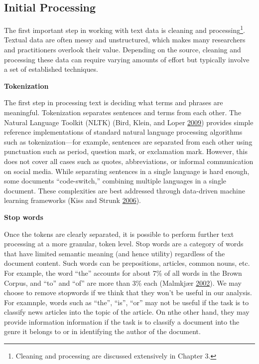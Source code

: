 \documentclass[]{krantz}
\begin{document}
\subsection{Initial Processing}\label{initial-processing}

The first important step in working with text data is cleaning and
processing\footnote{Cleaning and processing are discussed extensively in
  Chapter 3.}. Textual data are often messy and unstructured, which
makes many researchers and practitioners overlook their value. Depending
on the source, cleaning and processing these data can require varying
amounts of effort but typically involve a set of established techniques.

\textbf{Tokenization}

The first step in processing text is deciding what terms and phrases are
meaningful. Tokenization separates sentences and terms from each other.
The Natural Language Toolkit (NLTK) (Bird, Klein, and Loper
\protect\hyperlink{ref-bird-09}{2009}) provides simple reference
implementations of standard natural language processing algorithms such
as tokenization---for example, sentences are separated from each other
using punctuation such as period, question mark, or exclamation mark.
However, this does not cover all cases such as quotes, abbreviations, or
informal communication on social media. While separating sentences in a
single language is hard enough, some documents ``code-switch,''
combining multiple languages in a single document. These complexities
are best addressed through data-driven machine learning frameworks (Kiss
and Strunk \protect\hyperlink{ref-kiss-06}{2006}).

\textbf{Stop words}

Once the tokens are clearly separated, it is possible to perform further
text processing at a more granular, token level. Stop words are a
category of words that have limited semantic meaning (and hence utility)
regardless of the document content. Such words can be prepositions,
articles, common nouns, etc. For example, the word ``the'' accounts for
about 7\% of all words in the Brown Corpus, and ``to'' and ``of'' are
more than 3\% each (Malmkjær \protect\hyperlink{ref-malmkjar-02}{2002}).
We may choose to remove stopwords if we think that they won't be useful
in our analysis. For examnple, words such as ``the'', ``is'', ``or'' may
not be useful if the task is to classify news articles into the topic of
the article. On nthe other hand, they may provide information
information if the task is to classify a document into the genre it
belongs to or in identifying the author of the document.
\end{document}

